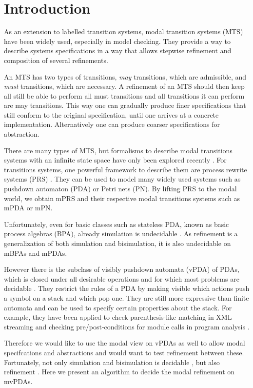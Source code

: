 
\newpage

\chapter{Introduction}

As an extension to labelled transition systems,
modal transition systems (MTS) \cite{LarsenT88}
have been widely used, especially in model checking.
They provide a way to describe systems specifications
in a way that allows stepwise refinement
and composition of several refinements.

An MTS has two types of transitions, \emph{may} transitions, which are admissible,
and \emph{must} transitions, which are necessary.
A refinement of an MTS should then keep all still be able to perform
all must transitions and all transitions it can perform are may transitions.
This way one can gradually produce finer specifications that still conform
to the original specification, until one arrives at a concrete implementation.
Alternatively one can produce coarser specifications for abstraction.

There are many types of MTS, 
but formalisms to describe modal transitions systems with
an infinite state space have only been explored recently \cite{BenesK12}.
For transitions systems, one powerful framework to describe them are
process rewrite systems (PRS) \cite{Mayr00, Esparza01}.
They can be used to model many widely used systems
such as pushdown automaton (PDA) or Petri nets (PN).
By lifting PRS to the modal world, we obtain mPRS
and their respective modal transitions systems such as
mPDA or mPN.

Unfortunately, even for basic classes such as
stateless PDA, known as basic process algebras (BPA), already simulation is
undecidable \cite{GrooteH94}.
As refinement is a generalization of both simulation and bisimulation,
it is also undecidable on mBPAs and mPDAs.

However there is the subclass of visibly pushdown automata (vPDA)
of PDAs,
which is closed under all desirable operations
and for which most problems are decidable \cite{AlurM04}.
They restrict the rules of a PDA by making visible which
actions push a symbol on a stack and which pop one.
They are still more expressive than finite automata 
and can be used to specify certain properties about the stack.
For example, they have been applied to check
parenthesis-like matching in XML streaming
\cite{KumarMV07}
and checking pre/post-conditions for module calls
in program analysis \cite{AlurEM04}.

Therefore we would like to use the modal view on vPDAs
as well to allow modal specifcations and abstractions and
would want to test refinement between these.
Fortunately, not only simulation and bisimulation
is decidable \cite{Srba06},
but also refinement \cite{BenesK12}.
Here we present an algorithm to decide the modal refinement on mvPDAs.



